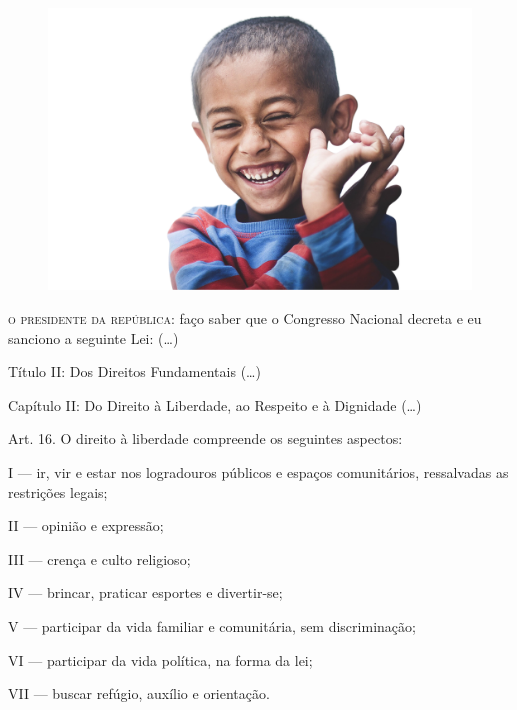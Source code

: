 \begin{myquote}

\begin{figure}[H]
\centering
\includegraphics[scale=0.25]{./imgSAEB_7_POR/media/image33.png}
\end{figure}

\textsc{o presidente da república}: faço saber que o Congresso Nacional decreta e
eu sanciono a seguinte Lei: (\ldots{})

Título II: Dos Direitos Fundamentais (\ldots{})

Capítulo II: Do Direito à Liberdade, ao Respeito e à Dignidade (\ldots{})

Art. 16. O direito à liberdade compreende os seguintes aspectos:

I --- ir, vir e estar nos logradouros públicos e espaços comunitários,
ressalvadas as restrições legais;

II --- opinião e expressão;

III --- crença e culto religioso;

IV --- brincar, praticar esportes e divertir-se;

V --- participar da vida familiar e comunitária, sem discriminação;

VI --- participar da vida política, na forma da lei;

VII --- buscar refúgio, auxílio e orientação. \\


\end{myquote}

